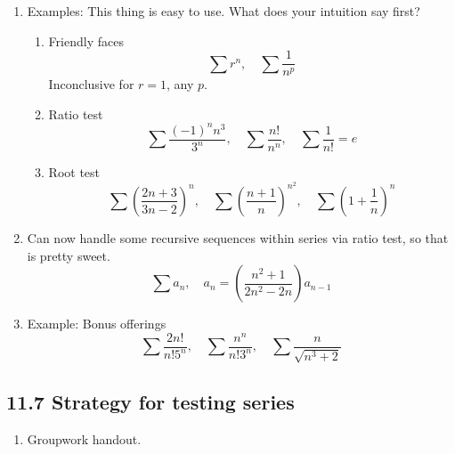 \documentclass{article}
\begin{document}
\begin{enumerate}
\begin{enumerate}
\item Examples: This thing is easy to use. What does your intuition say first?
\begin{enumerate}
\item Friendly faces
\[
\sum r^n, \quad \sum \frac{1}{n^p}
\]
Inconclusive for $r=1$, any $p$.
\item Ratio test
$$
\sum \frac{(-1)^nn^3}{3^n}, \quad \sum \frac{n!}{n^n}, \quad \sum \frac{1}{n!}=e
$$
\item Root test
$$
\sum\left(\frac{2n+3}{3n-2}\right)^n, \quad \sum \left(\frac{n+1}{n}\right)^{n^2}, \quad \sum \left(1+\frac{1}{n}\right)^n
$$
\end{enumerate}

\item Can now handle some recursive sequences within series via ratio test, so that is pretty sweet.
\[
\sum a_n, \quad a_n = (\frac{n^2+1}{2n^2-2n})a_{n-1}
\]

\item Example: Bonus offerings
$$
\sum \frac{2n!}{n!5^n}, \quad \sum \frac{n^n}{n!3^n}, \quad \sum \frac{n}{\sqrt{n^3+2}}
$$
\end{enumerate}
\end{enumerate}


\subsection{11.7 Strategy for testing series}
\begin{enumerate}
\item Groupwork handout.
\end{enumerate}


\end{document}

